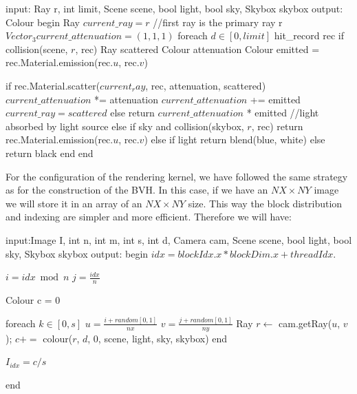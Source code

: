 \documentclass[titlepage,12pt]{report}
\begin{document}
\begin{algorithm}[caption={colour recursive}, label={color_alg_it}]
input: Ray r, int limit, Scene scene, bool light, bool sky, Skybox skybox
output: Colour
begin
  Ray $current\_ray = r$ //first ray is the primary ray r
  $Vector_3 current\_attenuation = (1,1,1)$
  foreach $d \in [0,limit]$
    hit_record rec
    if collision(scene, $r$, rec)
      Ray scattered
      Colour attenuation
      Colour emitted = rec.Material.emission(rec.$u$, rec.$v$)
      
      if rec.Material.scatter($current_ray$, rec, attenuation, scattered)
        $current\_attenuation$ *= attenuation 
        $current\_attenuation$ += emitted
        $current\_ray = scattered$
      else
        return $current\_attenuation$ * emitted //light absorbed by light source
    else
      if sky and collision(skybox, $r$, rec)
        return rec.Material.emission(rec.$u$, rec.$v$)
      else
        if light
          return blend(blue, white)
        else
          return black      
  end
end
\end{algorithm}

For the configuration of the rendering kernel, we have followed the same strategy as for the construction of the BVH. In this case, if we have an $NX \times NY$ image we will store it in an array of an $NX \times NY$ size. This way the block distribution and indexing are simpler and more efficient. Therefore we will have:

\begin{algorithm}[caption={kernel renderer GPU}, label={renderer_cpu_par_alg}]
input:Image I,  int n, int m, int s, int d, Camera cam, Scene scene, bool light, bool sky, Skybox skybox
output:
begin
  $idx = blockIdx.x * blockDim.x + threadIdx.$ 
  
  $i = idx \bmod n $
  $j = \frac{idx}{n} $
  
  Colour c = 0
  
  foreach $k \in [0,s] $
    $u = \frac{i + random[0,1]}{nx}$
    $v = \frac{j + random[0,1]}{ny}$
    Ray $r \gets $ cam.getRay($u$, $v$);      
    $c += $ colour($r$, $d$, $0$, scene, light, sky, skybox)
  end    

   $I_{idx} = c/s$  
  
end
\end{algorithm}

\newpage

\printbibliography
\end{document}
